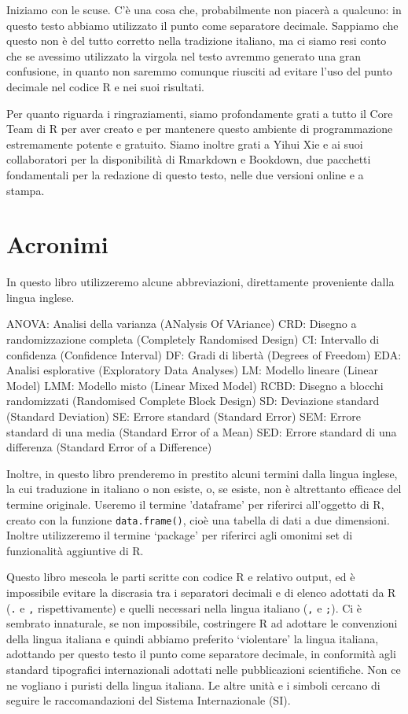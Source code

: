 \documentclass[
  12pt,
]{book}
\begin{document}
Iniziamo con le scuse. C'è una cosa che, probabilmente non piacerà a qualcuno: in questo testo abbiamo utilizzato il punto come separatore decimale. Sappiamo che questo non è del tutto corretto nella tradizione italiano, ma ci siamo resi conto che se avessimo utilizzato la virgola nel testo avremmo generato una gran confusione, in quanto non saremmo comunque riusciti ad evitare l'uso del punto decimale nel codice R e nei suoi risultati.

Per quanto riguarda i ringraziamenti, siamo profondamente grati a tutto il Core Team di R per aver creato e per mantenere questo ambiente di programmazione estremamente potente e gratuito. Siamo inoltre grati a Yihui Xie e ai suoi collaboratori per la disponibilità di Rmarkdown e Bookdown, due pacchetti fondamentali per la redazione di questo testo, nelle due versioni online e a stampa.

\hypertarget{acronimi}{%
\section*{Acronimi}\label{acronimi}}

In questo libro utilizzeremo alcune abbreviazioni, direttamente proveniente dalla lingua inglese.

ANOVA: Analisi della varianza (ANalysis Of VAriance)
CRD: Disegno a randomizzazione completa (Completely Randomised Design)
CI: Intervallo di confidenza (Confidence Interval)
DF: Gradi di libertà (Degrees of Freedom)
EDA: Analisi esplorative (Exploratory Data Analyses)
LM: Modello lineare (Linear Model)
LMM: Modello misto (Linear Mixed Model)
RCBD: Disegno a blocchi randomizzati (Randomised Complete Block Design)
SD: Deviazione standard (Standard Deviation)
SE: Errore standard (Standard Error)
SEM: Errore standard di una media (Standard Error of a Mean)
SED: Errore standard di una differenza (Standard Error of a Difference)

Inoltre, in questo libro prenderemo in prestito alcuni termini dalla lingua inglese, la cui traduzione in italiano o non esiste, o, se esiste, non è altrettanto efficace del termine originale. Useremo il termine 'dataframe' per riferirci all'oggetto di R, creato con la funzione \texttt{data.frame()}, cioè una tabella di dati a due dimensioni. Inoltre utilizzeremo il termine `package' per riferirci agli omonimi set di funzionalità aggiuntive di R.

Questo libro mescola le parti scritte con codice R e relativo output, ed è impossibile evitare la discrasia tra i separatori decimali e di elenco adottati da R (\texttt{.} e \texttt{,} rispettivamente) e quelli necessari nella lingua italiano (\texttt{,} e \texttt{;}). Ci è sembrato innaturale, se non impossibile, costringere R ad adottare le convenzioni della lingua italiana e quindi abbiamo preferito `violentare' la lingua italiana, adottando per questo testo il punto come separatore decimale, in conformità agli standard tipografici internazionali adottati nelle pubblicazioni scientifiche. Non ce ne vogliano i puristi della lingua italiana. Le altre unità e i simboli cercano di seguire le raccomandazioni del Sistema Internazionale (SI).
\end{document}
